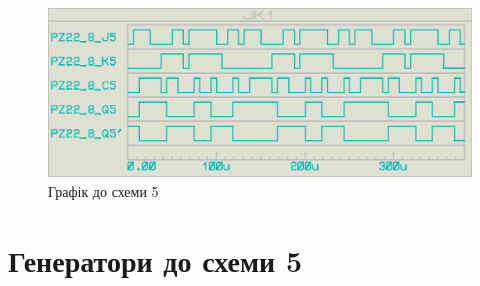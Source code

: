 \documentclass{article}
\begin{document}
\begin{normalsize}
	\begin{figure}[H]
		\centering
		\includegraphics[scale=0.25]{g5}	
		\caption{Графік до схеми 5}
	\end{figure}

	\section*{Генератори до схеми 5}
	\begin{figure}[H]
		\centering
		\hspace{5px}
		

\end{figure}
\end{normalsize}
\end{document}
